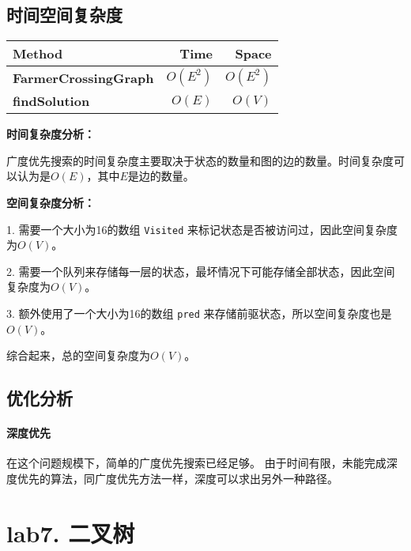 \documentclass[UTF8]{ctexart}
\begin{document}
\subsection*{时间空间复杂度}

\begin{center}
    \begin{tabular}{|l|r|r|} \hline
        Method & Time & Space \\\hline
        \textbf{FarmerCrossingGraph} & $O(E^2)$ & $O(E^2)$ \\
        \textbf{findSolution} & $O(E)$ & $O(V)$ \\ \hline
    \end{tabular}
\end{center}

\textbf{时间复杂度分析：}

广度优先搜索的时间复杂度主要取决于状态的数量和图的边的数量。时间复杂度可以认为是$O(E)$，其中$E$是边的数量。

\textbf{空间复杂度分析：}

1. 需要一个大小为16的数组 \texttt{Visited} 来标记状态是否被访问过，因此空间复杂度为$O(V)$。

2. 需要一个队列来存储每一层的状态，最坏情况下可能存储全部状态，因此空间复杂度为$O(V)$。

3. 额外使用了一个大小为16的数组 \texttt{pred} 来存储前驱状态，所以空间复杂度也是$O(V)$。

综合起来，总的空间复杂度为$O(V)$。

\subsection*{优化分析}
\paragraph*{深度优先}
在这个问题规模下，简单的广度优先搜索已经足够。
由于时间有限，未能完成深度优先的算法，同广度优先方法一样，深度可以求出另外一种路径。

\newpage
\section*{lab7. 二叉树}
\end{document}
